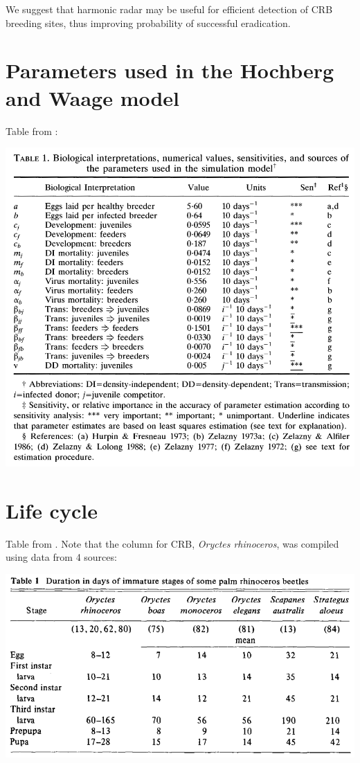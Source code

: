 \documentclass[12pt,letterpaper,english,bibliography=totocnumbered, abstract=on]{scrartcl}
\begin{document}
We suggest that harmonic radar may be useful for efficient detection of CRB breeding sites, thus improving probability of successful eradication.

\section{Parameters used in the Hochberg and Waage model}

Table from \cite{hochberg_model_1991}:
\begin{center}
	\includegraphics[width=0.7\linewidth]{../images/hochberg-model-params}
\end{center}


\section{Life cycle}

Table from \cite{bedford_biology_1980}. Note that the column for CRB, \textit{Oryctes rhinoceros}, was compiled using data from 4 sources:

\begin{center}
	\includegraphics[width=0.7\linewidth]{../crb-life-cycle}
\end{center}
\end{document}
